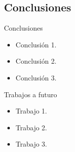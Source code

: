 \documentclass[
  aspectratio=169,
]{beamer}
\begin{document}
\begin{small}
\section[Conclusiones]{Conclusiones}

\begin{frame}{Conclusiones }
	\begin{itemize}
		\item  Conclusión 1. 
		\pause 
		\item  Conclusión 2. 
		\pause
		\item  Conclusión 3. 
	\end{itemize}
\end{frame}
\begin{frame}{Trabajos a futuro }
	\begin{itemize}
		\item Trabajo 1.
		\pause
		\item Trabajo 2.
		\pause
		\item Trabajo 3.
	\end{itemize}
\end{frame}


\end{small}
\end{document}
